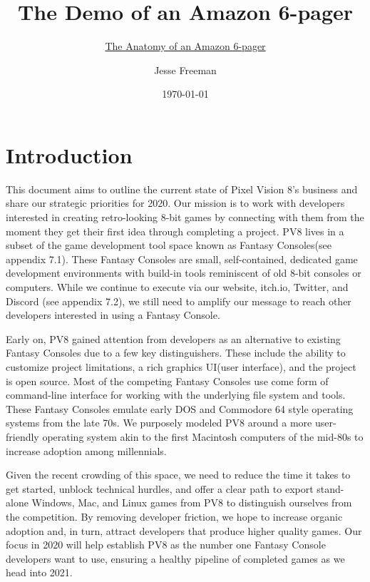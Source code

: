 \documentclass{sixpage}
\title{The Demo of an Amazon 6-pager}
\subtitle{\href{https://writingcooperative.com/the-anatomy-of-an-amazon-6-pager-fc79f31a41c9}{The Anatomy of an Amazon 6-pager}}  %
\author{Jesse Freeman}
\date{\today}
\begin{document}
    \maketitle


    \section{Introduction}
    This document aims to outline the current state of Pixel Vision 8's business and share our strategic priorities for 2020.
    Our mission is to work with developers interested in creating retro-looking 8-bit games by connecting with them from the moment they get their first idea through completing a project.
    PV8 lives in a subset of the game development tool space known as Fantasy Consoles(see appendix 7.1).
    These Fantasy Consoles are small, self-contained, dedicated game development environments with build-in tools reminiscent of old 8-bit consoles or computers.
    While we continue to execute via our website, itch.io, Twitter, and Discord (see appendix 7.2), we still need to amplify our message to reach other developers interested in using a Fantasy Console.

    Early on, PV8 gained attention from developers as an alternative to existing Fantasy Consoles due to a few key distinguishers.
    These include the ability to customize project limitations, a rich graphics UI(user interface), and the project is open source.
    Most of the competing Fantasy Consoles use come form of command-line interface for working with the underlying file system and tools.
    These Fantasy Consoles emulate early DOS and Commodore 64 style operating systems from the late 70s.
    We purposely modeled PV8 around a more user-friendly operating system akin to the first Macintosh computers of the mid-80s to increase adoption among millennials.

    Given the recent crowding of this space, we need to reduce the time it takes to get started, unblock technical hurdles, and offer a clear path to export stand-alone Windows, Mac, and Linux games from PV8 to distinguish ourselves from the competition.
    By removing developer friction, we hope to increase organic adoption and, in turn, attract developers that produce higher quality games.
    Our focus in 2020 will help establish PV8 as the number one Fantasy Console developers want to use, ensuring a healthy pipeline of completed games as we head into 2021.
\end{document}
